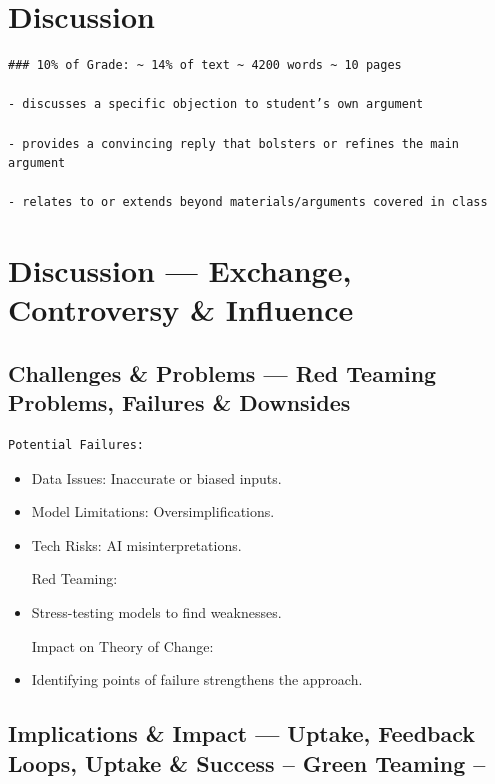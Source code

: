 \documentclass[
  letterpaper,
]{book}
\begin{document}

\chapter{Discussion}\label{discussion}

\begin{verbatim}
### 10% of Grade: ~ 14% of text ~ 4200 words ~ 10 pages

- discusses a specific objection to student’s own argument

- provides a convincing reply that bolsters or refines the main argument

- relates to or extends beyond materials/arguments covered in class
\end{verbatim}


\chapter{Discussion --- Exchange, Controversy \&
Influence}\label{discussion-exchange-controversy-influence}

\section{Challenges \& Problems --- Red Teaming Problems, Failures \&
Downsides}\label{challenges-problems-red-teaming-problems-failures-downsides}

\begin{verbatim}
Potential Failures:
\end{verbatim}

\begin{itemize}
\item
  Data Issues: Inaccurate or biased inputs.\\
\item
  Model Limitations: Oversimplifications.\\
\item
  Tech Risks: AI misinterpretations.

  Red Teaming:
\item
  Stress-testing models to find weaknesses.

  Impact on Theory of Change:
\item
  Identifying points of failure strengthens the approach.
\end{itemize}

\section{Implications \& Impact --- Uptake, Feedback Loops, Uptake \&
Success -- Green Teaming
--}\label{implications-impact-uptake-feedback-loops-uptake-success-green-teaming}
\end{document}
